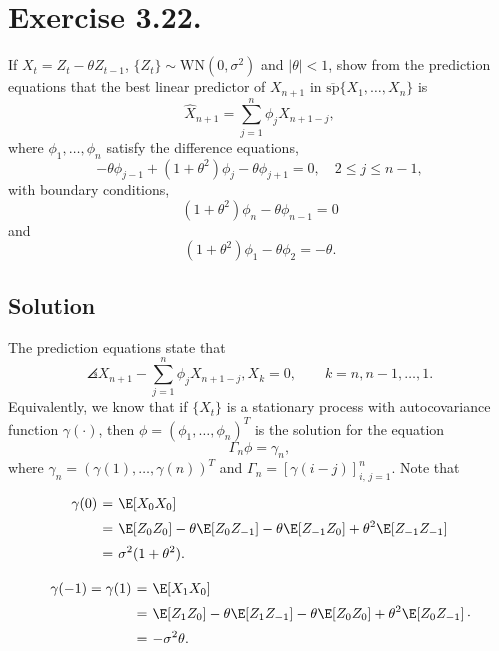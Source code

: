 \section*{Exercise 3.22.}

If $X_t = Z_t - \theta Z_{t-1}$, $\{Z_t\} \sim \text{WN}(0, \sigma^2)$ and $|\theta| < 1$, show from the prediction equations that the best linear predictor of $X_{n+1}$ in $\overline{\text{sp}}\{X_1, \dots, X_n\}$ is
\[ \hat{X}_{n+1} = \sum_{j=1}^{n} \phi_j X_{n+1-j}, \]
where $\phi_1, \dots, \phi_n$ satisfy the difference equations,
\[ -\theta \phi_{j-1} + (1 + \theta^2) \phi_j - \theta \phi_{j+1} = 0, \quad 2 \leq j \leq n-1, \]
with boundary conditions,
\[ (1 + \theta^2) \phi_n - \theta \phi_{n-1} = 0 \]
and
\[ (1 + \theta^2) \phi_1 - \theta \phi_2 = -\theta. \]

\subsection*{Solution}

The prediction equations state that
\[ \angles{X_{n+1}-\sum_{j=1}^{n}\phi_{j}X_{n+1-j},X_{k}}=0,\qquad k=n,n-1,\ldots,1. \]
Equivalently, we know that if $\{X_t\}$ is a stationary process with autocovariance function $\gamma(\cdot)$, then $\phi = (\phi_1,\ldots, \phi_n)^T$ is the solution for the equation
\[ \Gamma_n \phi = \gamma_n, \]
where $\gamma_{n}=(\gamma(1),\ldots,\gamma(n))^{T}$ and $\Gamma_{n}=[\gamma(i-j)]_{i,\, j=1}^{n}$. Note that
\[ \everymath{\displaystyle}
\arraycolsep=1.8pt\def\arraystretch{1.5}
\begin{array}{rcl}
    \gamma(0) & = & \E[X_0 X_0]\\
    & = & \E[Z_0 Z_0] - \theta \E[Z_0 Z_{-1}] - \theta \E[Z_{-1} Z_{0}] + \theta^2 \E[Z_{-1} Z_{-1}]\\
    & = & \sigma^2(1 + \theta^2). 
\end{array} \]
\[ \everymath{\displaystyle}
\arraycolsep=1.8pt\def\arraystretch{1.5}
\begin{array}{rcl}
    \gamma(-1) = \gamma(1) & = & \E[X_1 X_0]\\
    & = & \E[Z_1 Z_0] - \theta \E[Z_1 Z_{-1}] - \theta \E[Z_{0} Z_{0}] + \theta^2 \E[Z_{0} Z_{-1}]\\
    & = & -\sigma^2 \theta. 
\end{array}. \]

